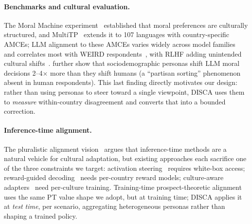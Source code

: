 \documentclass{article}
\begin{document}
\paragraph{Benchmarks and cultural evaluation.}
The Moral Machine experiment~\citep{awad2018moral} established that moral preferences are culturally structured, and MultiTP~\citep{jin2025multitp} extends it to 107 languages with country-specific AMCEs; LLM alignment to these AMCEs varies widely across model families~\citep{takemoto2024moral, ahmad2025largescale} and correlates most with WEIRD respondents~\citep{santurkar2023opinions, henrich2010weirdest}, with RLHF adding unintended cultural shifts~\citep{ryan2024unintended, zewail2025moral}. \citet{kim2025persona} further show that sociodemographic personas shift LLM moral decisions 2--4$\times$ more than they shift humans (a ``partisan sorting'' phenomenon absent in human respondents). This last finding directly motivates our design: rather than using personas to steer toward a single viewpoint, DISCA uses them to \emph{measure} within-country disagreement and converts that into a bounded correction. %

\paragraph{Inference-time alignment.}
The pluralistic alignment vision~\citep{sorensen2024roadmap} argues that inference-time methods are a natural vehicle for cultural adaptation, but existing approaches each sacrifice one of the three constraints we target: activation steering~\citep{arditi2025refusal, turner2023activation} requires white-box access; reward-guided decoding~\citep{khanov2024args, mudgal2024controlled} needs per-country reward models; culture-aware adapters~\citep{zhang2026culturemanager, yao2024caredio} need per-culture training. Training-time prospect-theoretic alignment~\citep{ethayarajh2024kto} uses the same PT value shape we adopt, but at training time; DISCA applies it at \emph{test time}, per scenario, aggregating heterogeneous personas rather than shaping a trained policy.
\end{document}
